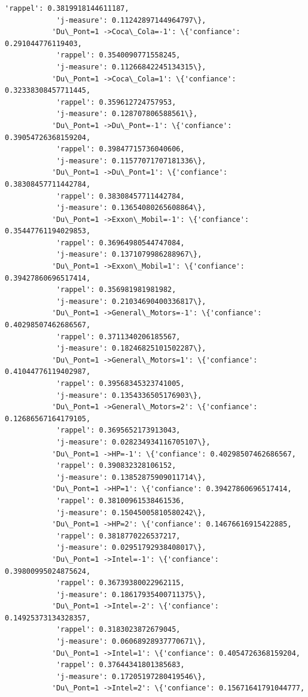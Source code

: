 \documentclass[11pt]{article}
\begin{document}
\begin{Verbatim}[commandchars=\\\{\}]
            'rappel': 0.3819918144611187,
            'j-measure': 0.11242897144964797\},
           'Du\_Pont=1 ->Coca\_Cola=-1': \{'confiance': 0.291044776119403,
            'rappel': 0.3540090771558245,
            'j-measure': 0.11266842245134315\},
           'Du\_Pont=1 ->Coca\_Cola=1': \{'confiance': 0.32338308457711445,
            'rappel': 0.359612724757953,
            'j-measure': 0.128707806588561\},
           'Du\_Pont=1 ->Du\_Pont=-1': \{'confiance': 0.39054726368159204,
            'rappel': 0.39847715736040606,
            'j-measure': 0.11577071707181336\},
           'Du\_Pont=1 ->Du\_Pont=1': \{'confiance': 0.38308457711442784,
            'rappel': 0.38308457711442784,
            'j-measure': 0.13654080265608864\},
           'Du\_Pont=1 ->Exxon\_Mobil=-1': \{'confiance': 0.35447761194029853,
            'rappel': 0.36964980544747084,
            'j-measure': 0.1371079986288967\},
           'Du\_Pont=1 ->Exxon\_Mobil=1': \{'confiance': 0.39427860696517414,
            'rappel': 0.356981981981982,
            'j-measure': 0.21034690400336817\},
           'Du\_Pont=1 ->General\_Motors=-1': \{'confiance': 0.40298507462686567,
            'rappel': 0.3711340206185567,
            'j-measure': 0.18246825101502287\},
           'Du\_Pont=1 ->General\_Motors=1': \{'confiance': 0.41044776119402987,
            'rappel': 0.39568345323741005,
            'j-measure': 0.1354336505176903\},
           'Du\_Pont=1 ->General\_Motors=2': \{'confiance': 0.12686567164179105,
            'rappel': 0.3695652173913043,
            'j-measure': 0.028234934116705107\},
           'Du\_Pont=1 ->HP=-1': \{'confiance': 0.40298507462686567,
            'rappel': 0.390832328106152,
            'j-measure': 0.13852875909011714\},
           'Du\_Pont=1 ->HP=1': \{'confiance': 0.39427860696517414,
            'rappel': 0.38100961538461536,
            'j-measure': 0.15045005810580242\},
           'Du\_Pont=1 ->HP=2': \{'confiance': 0.14676616915422885,
            'rappel': 0.3818770226537217,
            'j-measure': 0.02951792938408017\},
           'Du\_Pont=1 ->Intel=-1': \{'confiance': 0.39800995024875624,
            'rappel': 0.36739380022962115,
            'j-measure': 0.18617935400711375\},
           'Du\_Pont=1 ->Intel=-2': \{'confiance': 0.14925373134328357,
            'rappel': 0.3183023872679045,
            'j-measure': 0.06068928937770671\},
           'Du\_Pont=1 ->Intel=1': \{'confiance': 0.4054726368159204,
            'rappel': 0.37644341801385683,
            'j-measure': 0.17205197280419546\},
           'Du\_Pont=1 ->Intel=2': \{'confiance': 0.15671641791044777,

\end{Verbatim}
\end{document}
